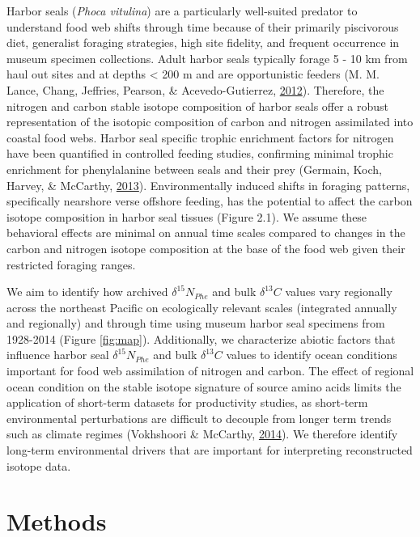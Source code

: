 \documentclass [11pt, proquest] {uwthesis}[2015/03/03]
\begin{document}
Harbor seals (\emph{Phoca vitulina}) are a particularly well-suited
predator to understand food web shifts through time because of their
primarily piscivorous diet, generalist foraging strategies, high site
fidelity, and frequent occurrence in museum specimen collections. Adult
harbor seals typically forage 5 - 10 km from haul out sites and at
depths \textless{} 200 m and are opportunistic feeders (M. M. Lance,
Chang, Jeffries, Pearson, \& Acevedo-Gutierrez,
\protect\hyperlink{ref-Lance2012}{2012}). Therefore, the nitrogen and
carbon stable isotope composition of harbor seals offer a robust
representation of the isotopic composition of carbon and nitrogen
assimilated into coastal food webs. Harbor seal specific trophic
enrichment factors for nitrogen have been quantified in controlled
feeding studies, confirming minimal trophic enrichment for phenylalanine
between seals and their prey (Germain, Koch, Harvey, \& McCarthy,
\protect\hyperlink{ref-Germain2013}{2013}). Environmentally induced
shifts in foraging patterns, specifically nearshore verse offshore
feeding, has the potential to affect the carbon isotope composition in
harbor seal tissues (Figure 2.1). We assume these behavioral effects are
minimal on annual time scales compared to changes in the carbon and
nitrogen isotope composition at the base of the food web given their
restricted foraging ranges.

We aim to identify how archived \(\delta^{15}N_{Phe}\) and bulk
\(\delta^{13}C\) values vary regionally across the northeast Pacific on
ecologically relevant scales (integrated annually and regionally) and
through time using museum harbor seal specimens from 1928-2014 (Figure
\ref{fig:map}). Additionally, we characterize abiotic factors that
influence harbor seal \(\delta^{15}N_{Phe}\) and bulk \(\delta^{13}C\)
values to identify ocean conditions important for food web assimilation
of nitrogen and carbon. The effect of regional ocean condition on the
stable isotope signature of source amino acids limits the application of
short-term datasets for productivity studies, as short-term
environmental perturbations are difficult to decouple from longer term
trends such as climate regimes (Vokhshoori \& McCarthy,
\protect\hyperlink{ref-Vokshoori2014}{2014}). We therefore identify
long-term environmental drivers that are important for interpreting
reconstructed isotope data.

\section{Methods}\label{methods-1}
\end{document}
